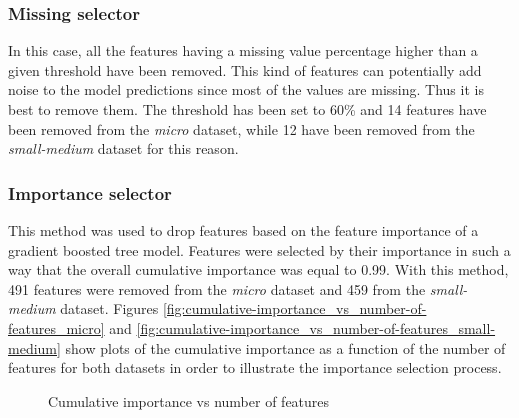 \documentclass[LaM,binding=0.6cm, english]{sapthesis}
\begin{document}
\subsubsection{Missing selector}

In this case, all the features having a missing value percentage higher than a given threshold have been removed. This kind of features can potentially add noise to the model predictions since most of the values are missing. Thus it is best to remove them. The threshold has been set to 60\% and 14 features have been removed from the \textit{micro} dataset, while 12 have been removed from the \textit{small-medium} dataset for this reason.

\subsubsection{Importance selector}

This method was used to drop features based on the feature importance of a gradient boosted tree model. Features were selected by their importance in such a way that the overall cumulative importance was equal to 0.99. With this method, 491 features were removed from the \textit{micro} dataset and 459 from the \textit{small-medium} dataset. Figures \ref{fig:cumulative-importance_vs_number-of-features_micro} and \ref{fig:cumulative-importance_vs_number-of-features_small-medium} show plots of the cumulative importance as a function of the number of features for both datasets in order to illustrate the importance selection process.

\begin{figure}[!ht]
  \centering
  \hfill
  \caption{Cumulative importance vs number of features}
\end{figure}
\end{document}
